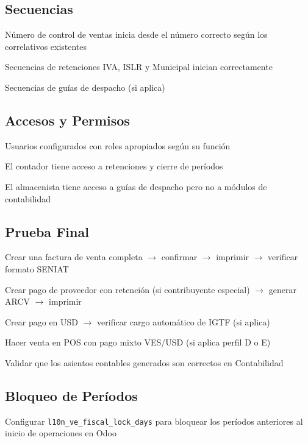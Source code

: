 \documentclass[11pt,a4paper]{article}
\newcommand{\modulo}[1]{\texttt{\textcolor{naranja}{#1}}}
\begin{document}
\begin{Form}
\subsection*{Secuencias}
\begin{checklist}
  \item Número de control de ventas inicia desde el número correcto según los correlativos existentes
  \item Secuencias de retenciones IVA, ISLR y Municipal inician correctamente
  \item Secuencias de guías de despacho (si aplica)
\end{checklist}

\subsection*{Accesos y Permisos}
\begin{checklist}
  \item Usuarios configurados con roles apropiados según su función
  \item El contador tiene acceso a retenciones y cierre de períodos
  \item El almacenista tiene acceso a guías de despacho pero no a módulos de contabilidad
\end{checklist}

\subsection*{Prueba Final}
\begin{checklist}
  \item Crear una factura de venta completa $\rightarrow$ confirmar $\rightarrow$ imprimir $\rightarrow$ verificar formato SENIAT
  \item Crear pago de proveedor con retención (si contribuyente especial) $\rightarrow$ generar ARCV $\rightarrow$ imprimir
  \item Crear pago en USD $\rightarrow$ verificar cargo automático de IGTF (si aplica)
  \item Hacer venta en POS con pago mixto VES/USD (si aplica perfil D o E)
  \item Validar que los asientos contables generados son correctos en Contabilidad
\end{checklist}

\subsection*{Bloqueo de Períodos}
\begin{checklist}
  \item Configurar \modulo{l10n\_ve\_fiscal\_lock\_days} para bloquear los períodos anteriores al inicio de operaciones en Odoo
\end{checklist}


\end{Form}
\end{document}
